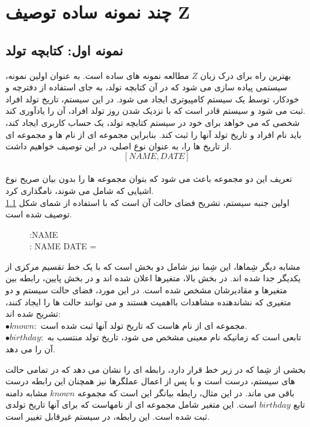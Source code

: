 \chapter{ چند نمونه ساده توصیف Z}\label{chapter4}


\section{نمونه اول: کتابچه تولد}
بهترین راه برای درک زبان $Z$ مطالعه نمونه های ساده است. به عنوان اولین نمونه، سیستمی پیاده سازی می شود که در آن کتابچه تولد، به جای استفاده از دفترچه و خودکار، توسط یک سیستم کامپیوتری ایجاد می شود. در این سیستم، تاریخ تولد افراد ثبت می شود و سیستم قادر است که با نزدیک شدن روز تولد افراد، آن را یادآوری کند.\\
شخصی که می خواهد برای خود در سیستم کتابچه تولد، یک حساب کاربری ایجاد کند، باید نام افراد و تاریخ تولد آنها را ثبت کند.  بنابراین مجموعه ای از نام ها و مجموعه ای از تاریخ ها را، به عنوان نوع اصلی، در این توصیف خواهیم داشت.\\
 \[
 [NAME, DATE]
 \]
 \\
 تعریف این دو مجموعه باعث می شود که بتوان مجموعه ها را بدون بیان صریح نوع اشیایی که شامل می شوند، نامگذاری کرد.  \\
 اولین جنبه سیستم، تشریح فضای حالت آن است که با استفاده از شمای شکل 
 \ref{fig4-1}
 توصیف شده است.\\
\begin{figure}
\centering
\begin{schema}{}
 :\enspace NAME\\
 : NAME \nrightarrow DATE
\ST
{} = \dom \enspace {}\\
\end{schema}
\caption{}
\label{fig4-1}
\end{figure}
مشابه دیگر شِماها، این شِما نیز شامل دو بخش است که با یک خط تقسیم مرکزی از یکدیگر جدا شده اند. در بخش بالا، متغیرها اعلان شده اند و در بخش پایین، رابطه بین متغیرها و مقادیرشان مشخص شده است. در این مورد، فضای حالت سیستم و دو متغیری که نشاندهنده مشاهدات بااهمیت هستند و می توانند حالت ها را ایجاد کنند، تشریح شده اند:
\\
$\bullet known:$
مجموعه ای از نام هاست که تاریخ تولد آنها ثبت شده است.
\\
$\bullet birthday:$
تابعی است که زمانیکه نام معینی مشخص می شود، تاریخ تولد منتسب به آن را می دهد.

 
بخشی از شِما که در زیر خط قرار دارد، رابطه ای را نشان می دهد که در تمامی حالت های سیستم، درست است و با پس از اعمال عملگرها نیز همچنان این رابطه درست باقی می ماند. در این مثال، رابطه بیانگر این است که مجموعه $known$ مشابه دامنه تابع $birthday$ است. این متغیر شامل مجموعه ای از نامهاست که برای آنها تاریخ تولدی ثبت شده است. این رابطه، در سیستم غیرقابل تغییر است.
\\


